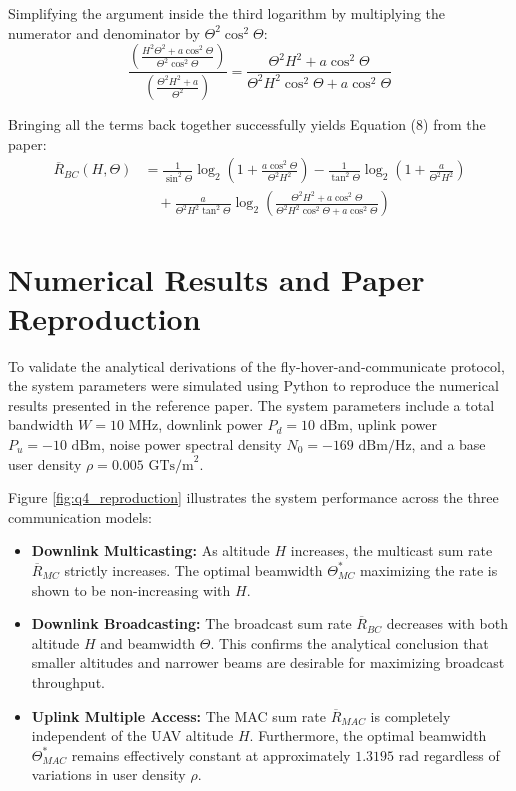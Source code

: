 \documentclass[11pt,a4paper]{article}
\begin{document}
        Simplifying the argument inside the third logarithm by multiplying the numerator and denominator by $\Theta^2 \cos^2\Theta$:
        $$\frac{\left(\frac{H^2\Theta^2 + a\cos^2\Theta}{\Theta^2\cos^2\Theta}\right)}{\left(\frac{\Theta^2H^2 + a}{\Theta^2}\right)} = \frac{\Theta^2 H^2 + a \cos^2\Theta}{\Theta^2 H^2 \cos^2\Theta + a \cos^2\Theta}$$

        Bringing all the terms back together successfully yields Equation (8) from the paper:
        \begin{align*}
        \overline{R}_{BC}(H,\Theta) &= \frac{1}{\sin^2\Theta}\log_2\left(1 + \frac{a \cos^2\Theta}{\Theta^2 H^2}\right) - \frac{1}{\tan^2\Theta}\log_2\left(1 + \frac{a}{\Theta^2 H^2}\right) \\
        &\quad + \frac{a}{\Theta^2 H^2 \tan^2\Theta}\log_2\left(\frac{\Theta^2 H^2 + a \cos^2\Theta}{\Theta^2 H^2 \cos^2\Theta + a \cos^2\Theta}\right)
        \end{align*}

\section{Numerical Results and Paper Reproduction}
To validate the analytical derivations of the fly-hover-and-communicate protocol, the system parameters were simulated using Python to reproduce the numerical
results presented in the reference paper. The system parameters include a total bandwidth $W = 10 \text{ MHz}$, downlink power $P_d = 10 \text{ dBm}$,
uplink power $P_u = -10 \text{ dBm}$, noise power spectral density $N_0 = -169 \text{ dBm/Hz}$, and a base user density $\rho = 0.005 \text{ GTs/m}^2$.

Figure \ref{fig:q4_reproduction} illustrates the system performance across the three communication models:
\begin{itemize}
    \item \textbf{Downlink Multicasting:} As altitude $H$ increases, the multicast sum rate $\overline{R}_{MC}$ strictly increases.
    The optimal beamwidth $\Theta^*_{MC}$ maximizing the rate is shown to be non-increasing with $H$.
    \item \textbf{Downlink Broadcasting:} The broadcast sum rate $\overline{R}_{BC}$ decreases with both altitude $H$ and beamwidth $\Theta$.
    This confirms the analytical conclusion that smaller altitudes and narrower beams are desirable for maximizing broadcast throughput.
    \item \textbf{Uplink Multiple Access:} The MAC sum rate $\overline{R}_{MAC}$ is completely independent of the UAV altitude $H$.
    Furthermore, the optimal beamwidth $\Theta^*_{MAC}$ remains effectively constant at approximately $1.3195 \text{ rad}$ regardless of variations in user density $\rho$.
\end{itemize}
\end{document}
